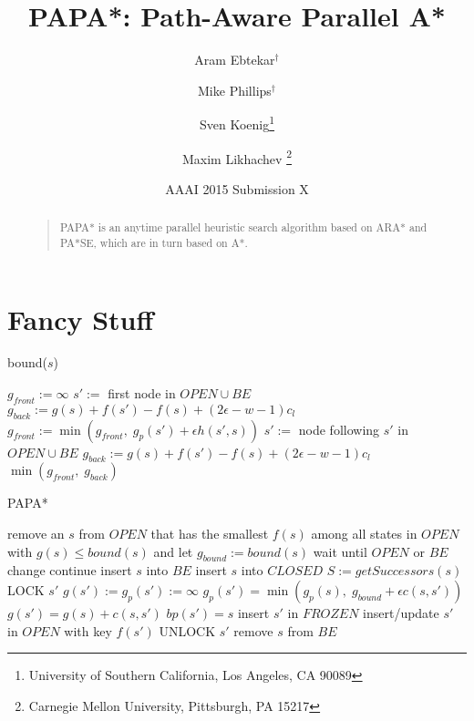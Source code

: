 \documentclass[letterpaper]{article}
\begin{document}
%
\title{PAPA*: Path-Aware Parallel A*}
\author{Aram Ebtekar$^\dagger$ \and Mike Phillips$^\dagger$ \and Sven Koenig\thanks{University of Southern California, Los Angeles, CA 90089} \and Maxim Likhachev%
\thanks{Carnegie Mellon University, Pittsburgh, PA 15217}%
%
}
\author{AAAI 2015 Submission X}%
\maketitle
\begin{abstract}
\begin{quote}
PAPA* is an anytime parallel heuristic search algorithm based on ARA* and PA*SE, which are in turn based on A*.
\end{quote}
\end{abstract}

\section{Fancy Stuff}

\begin{algorithm}
\caption{bound($s$)}
\label{alg:bound}
\begin{algorithmic}
\STATE $g_{front} := \infty$
\STATE $s' :=$ first node in $OPEN \cup BE$
\STATE $g_{back} := g(s) + f(s') - f(s) + (2\epsilon-w-1) c_l$
\STATE $g_{front} := \min(g_{front},\;g_p(s') + \epsilon h(s',s))$
\STATE $s' :=$ node following $s'$ in $OPEN \cup BE$
\STATE $g_{back} := g(s) + f(s') - f(s) + (2\epsilon-w-1) c_l$
\ENDWHILE
\RETURN $\min(g_{front},\;g_{back})$
\end{algorithmic}
\end{algorithm}

\begin{algorithm}
\caption{PAPA*}
\label{alg:PAPA*}
\begin{algorithmic}
\STATE remove an $s$ from $OPEN$ that has the smallest $f(s)$ among all states in $OPEN$ with $g(s) \le bound(s)$ and let $g_{bound} := bound(s)$
\STATE wait until $OPEN$ or $BE$ change
\STATE continue
\ENDIF
\STATE insert $s$ into $BE$
\STATE insert $s$ into $CLOSED$
\STATE $S := getSuccessors(s)$
\STATE LOCK $s'$
\STATE $g(s') := g_p(s') := \infty$
\ENDIF
\STATE $g_p(s') = \min(g_p(s),\; g_{bound} + \epsilon c(s,s'))$
\STATE $g(s') = g(s) + c(s,s')$
\STATE $bp(s') = s$
\STATE insert $s'$ in $FROZEN$
\ELSE
\STATE insert/update $s'$ in $OPEN$ with key $f(s')$
\ENDIF
\ENDIF
\STATE UNLOCK $s'$
\ENDFOR
\STATE remove $s$ from $BE$
\ENDWHILE
\end{algorithmic}
\end{algorithm}
\end{document}
